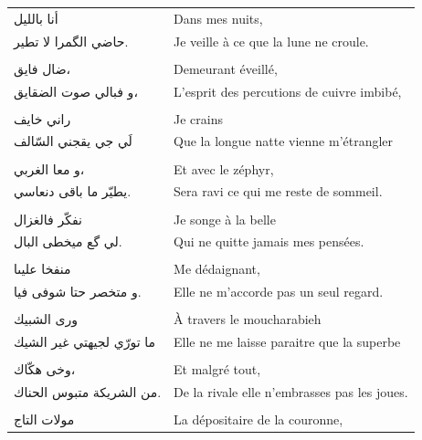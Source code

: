 

\begin{longtable}{R{0.3\textwidth} L{0.65\textwidth}}

\textarabic{أنا بالليل}                  &       Dans mes nuits,   \\
\textarabic{حاضي الگمرا لا تطير.}         &       Je veille à ce que la lune ne croule.   \\
\\
\textarabic{ضال فايق،}                   &       Demeurant éveillé,   \\
\textarabic{و فبالي صوت الضقايق،}        &       L’esprit des percutions de cuivre imbibé,   \\
\\
\textarabic{راني خايف}                   &       Je crains   \\
\textarabic{لَي جي يقجني السّالف}          &       Que la longue natte vienne m’étrangler   \\
\\
\textarabic{و معا الغربي،}               &       Et avec le zéphyr,   \\
\textarabic{يطيّر ما باقى دنعاسي.}        &       Sera ravi ce qui me reste de sommeil.   \\
\\
\textarabic{نفكّر فالغزال}                &       Je songe à la belle   \\
\textarabic{لي گع ميخطى البال.}          &       Qui ne quitte jamais mes pensées.   \\
\\
\textarabic{منفخا عليىا}                 &       Me dédaignant,   \\
\textarabic{و متخصر حتا شوفى فيا.}       &       Elle ne m’accorde pas un seul regard.   \\
\\
\textarabic{ورى الشبيك}                  &       À travers le moucharabieh   \\
\textarabic{ما تورّي لجيهتي غير الشيك}    &       Elle ne me laisse paraitre que la superbe   \\
\\
\textarabic{وخى هكّاك،}                   &       Et malgré tout,   \\
\textarabic{من الشريكة متبوس الحناك.}    &       De la rivale elle n’embrasses pas les joues.   \\
\\
\textarabic{مولات التاج}                  &       La dépositaire de la couronne,   \\

\end{longtable}
